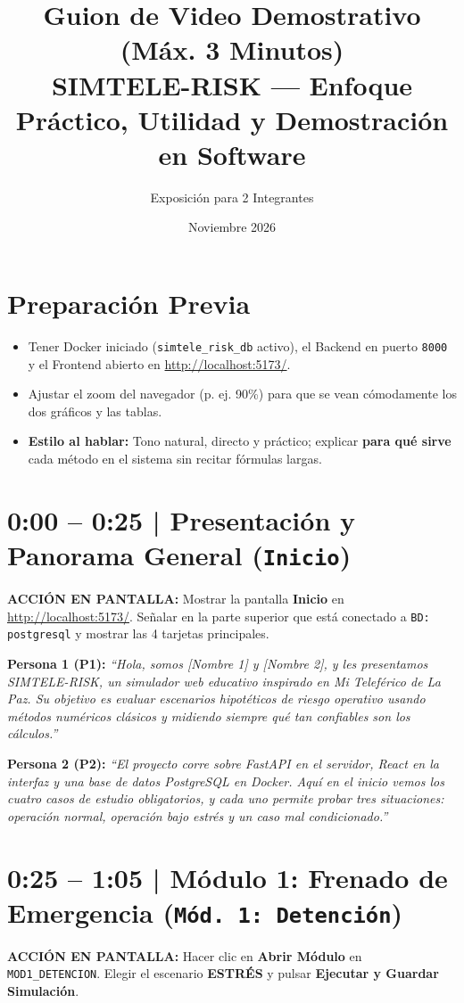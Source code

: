 \documentclass[11pt,a4paper]{article}
\title{\textbf{Guion de Video Demostrativo (Máx. 3 Minutos)} \\
\large SIMTELE-RISK — Enfoque Práctico, Utilidad y Demostración en Software}
\author{Exposición para 2 Integrantes}
\date{Noviembre 2026}
\newcommand{\accion}[1]{%
\begin{tcolorbox}[colback=accionbg,colframe=accionborder,boxrule=0.6pt,arc=2pt,left=6pt,right=6pt,top=4pt,bottom=4pt]
\small\textbf{ACCIÓN EN PANTALLA:} #1
\end{tcolorbox}
}
\newcommand{\puno}[1]{\noindent\textcolor{p1color}{\textbf{Persona 1 (P1):}} \textit{``#1''}\par\medskip}
\newcommand{\pdos}[1]{\noindent\textcolor{p2color}{\textbf{Persona 2 (P2):}} \textit{``#1''}\par\medskip}
\begin{document}
\maketitle

\section*{Preparación Previa}
\begin{itemize}[noitemsep]
    \item Tener Docker iniciado (\texttt{simtele\_risk\_db} activo), el Backend en puerto \texttt{8000} y el Frontend abierto en \url{http://localhost:5173/}.
    \item Ajustar el zoom del navegador (p. ej. 90\%) para que se vean cómodamente los dos gráficos y las tablas.
    \item \textbf{Estilo al hablar:} Tono natural, directo y práctico; explicar \textbf{para qué sirve} cada método en el sistema sin recitar fórmulas largas.
\end{itemize}

\section{0:00 -- 0:25 | Presentación y Panorama General (\texttt{Inicio})}
\accion{Mostrar la pantalla \textbf{Inicio} en \url{http://localhost:5173/}. Señalar en la parte superior que está conectado a \texttt{BD: postgresql} y mostrar las 4 tarjetas principales.}

\puno{Hola, somos [Nombre 1] y [Nombre 2], y les presentamos SIMTELE-RISK, un simulador web educativo inspirado en Mi Teleférico de La Paz. Su objetivo es evaluar escenarios hipotéticos de riesgo operativo usando métodos numéricos clásicos y midiendo siempre qué tan confiables son los cálculos.}

\pdos{El proyecto corre sobre FastAPI en el servidor, React en la interfaz y una base de datos PostgreSQL en Docker. Aquí en el inicio vemos los cuatro casos de estudio obligatorios, y cada uno permite probar tres situaciones: operación normal, operación bajo estrés y un caso mal condicionado.}

\section{0:25 -- 1:05 | Módulo 1: Frenado de Emergencia (\texttt{Mód. 1: Detención})}
\accion{Hacer clic en \textbf{Abrir Módulo} en \texttt{MOD1\_DETENCION}. Elegir el escenario \textbf{ESTRÉS} y pulsar \textbf{Ejecutar y Guardar Simulación}.}
\end{document}
